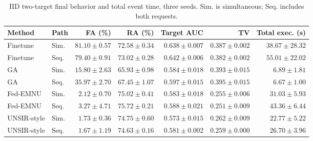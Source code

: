 \documentclass[software,article,submit,moreauthors]{Definitions/mdpi}
\begin{document}
\begin{table}[H]\centering\footnotesize\setlength{\tabcolsep}{3pt}

\caption{IID two-target final behavior and total event time, three seeds. Sim. is simultaneous; Seq. includes both requests.}

\label{tab:sequence-iid}

\begin{tabular}{llrrrrr}\toprule Method & Path & FA (\%) & RA (\%) & Target AUC & TV & Total exec. (s)\\\midrule

Finetune & Sim. & $81.10 \pm 0.57$ & $72.58 \pm 0.34$ & $0.638 \pm 0.007$ & $0.387 \pm 0.002$ & $38.67 \pm 28.32$\\

Finetune & Seq. & $79.40 \pm 0.91$ & $73.02 \pm 0.28$ & $0.642 \pm 0.006$ & $0.382 \pm 0.002$ & $55.01 \pm 22.02$\\

GA & Sim. & $15.80 \pm 2.63$ & $65.93 \pm 0.98$ & $0.584 \pm 0.018$ & $0.393 \pm 0.015$ & $6.89 \pm 1.81$\\

GA & Seq. & $35.97 \pm 2.70$ & $67.45 \pm 1.07$ & $0.597 \pm 0.015$ & $0.395 \pm 0.015$ & $6.67 \pm 1.00$\\

Fed-EMNU & Sim. & $2.12 \pm 0.70$ & $75.02 \pm 0.41$ & $0.583 \pm 0.018$ & $0.255 \pm 0.006$ & $31.03 \pm 5.93$\\

Fed-EMNU & Seq. & $3.27 \pm 4.71$ & $75.72 \pm 0.21$ & $0.588 \pm 0.021$ & $0.251 \pm 0.009$ & $43.36 \pm 6.44$\\

UNSIR-style & Sim. & $1.73 \pm 0.36$ & $74.75 \pm 0.60$ & $0.573 \pm 0.015$ & $0.262 \pm 0.009$ & $22.77 \pm 5.22$\\

UNSIR-style & Seq. & $1.67 \pm 1.19$ & $74.63 \pm 0.16$ & $0.581 \pm 0.002$ & $0.259 \pm 0.000$ & $26.70 \pm 3.96$\\

\bottomrule\end{tabular}\end{table}
\end{document}
